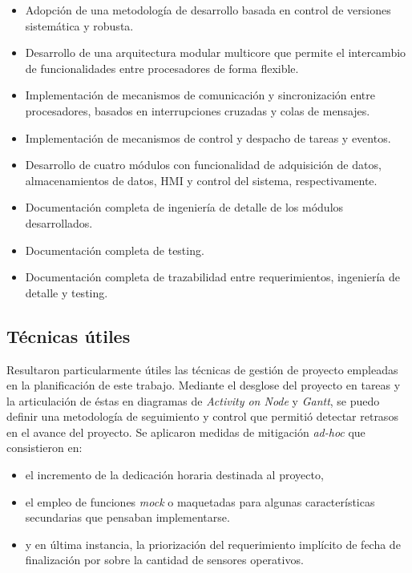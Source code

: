 \begin{itemize}
	\item Adopción de una metodología de desarrollo basada en control de versiones sistemática y robusta.
	\item Desarrollo de una arquitectura modular multicore que permite el intercambio de funcionalidades entre procesadores de forma flexible.
	\item Implementación de mecanismos de comunicación y sincronización entre procesadores, basados en interrupciones cruzadas y colas de mensajes.
	\item Implementación de mecanismos de control y despacho de tareas y eventos.
	\item Desarrollo de cuatro módulos con funcionalidad de adquisición de datos, almacenamientos de datos, HMI y control del sistema, respectivamente. 
	\item Documentación completa de ingeniería de detalle de los módulos desarrollados.
	\item Documentación completa de testing.
	\item Documentación completa de trazabilidad entre requerimientos, ingeniería de detalle y testing.
\end{itemize} 

\subsection{Técnicas útiles}
\label{subsec:tecnicas_utiles}

Resultaron particularmente útiles las técnicas de gestión de proyecto empleadas en la planificación de este trabajo.  Mediante el desglose del proyecto en tareas y la articulación de éstas en diagramas de \textit{Activity on Node} y \textit{Gantt}, se puedo definir una metodología de seguimiento y control que permitió detectar retrasos en el avance del proyecto. Se aplicaron medidas de mitigación \textit{ad-hoc} que consistieron en:

\begin{itemize}
	\item el incremento de la dedicación horaria destinada al proyecto,
	\item el empleo de funciones \textit{mock} o maquetadas para algunas características secundarias que pensaban implementarse.
	\item y en última instancia, la priorización del requerimiento implícito de fecha de finalización por sobre la cantidad de sensores operativos.
\end{itemize}  

